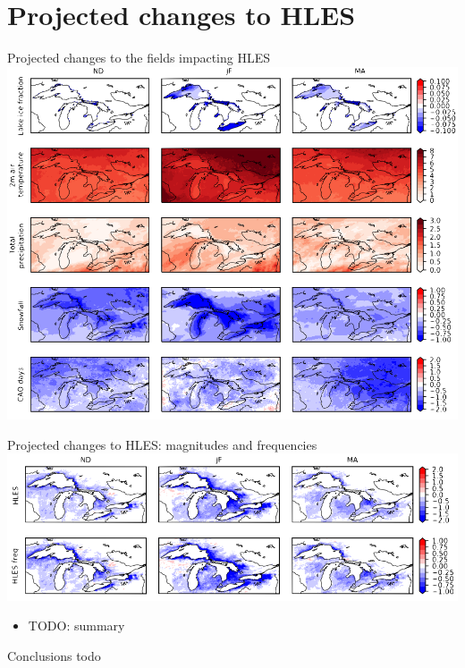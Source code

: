 \documentclass{beamer}
\begin{document}
  \section{Projected changes to HLES}
  \begin{frame}{Projected changes to the fields impacting HLES}
    \includegraphics[height=0.9\textheight]{projected_changes_to_surf_and_nearsurf_fields.png}
  \end{frame}

  \begin{frame}{Projected changes to HLES: magnitudes and frequencies}
    \includegraphics[width=\textwidth]{projected_changes_to_hles.png}
    \begin{itemize}
      \item TODO: summary
    \end{itemize}
  \end{frame}



  \begin{frame}{Conclusions}
    todo
  \end{frame}
\end{document}
